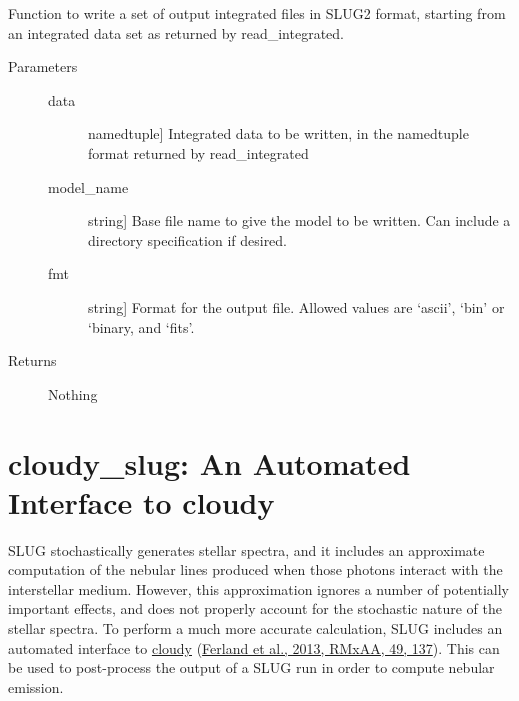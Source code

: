 \documentclass[letterpaper,10pt,english]{sphinxmanual}
\begin{document}
\begin{fulllineitems}
\label{slugpy:slugpy.write_integrated}
Function to write a set of output integrated files in SLUG2 format,
starting from an integrated data set as returned by
read\_integrated.
\begin{description}
\item[{Parameters}] \leavevmode\begin{description}
\item[{data}] \leavevmode{[}namedtuple{]}
Integrated data to be written, in the namedtuple format returned
by read\_integrated

\item[{model\_name}] \leavevmode{[}string{]}
Base file name to give the model to be written. Can include a
directory specification if desired.

\item[{fmt}] \leavevmode{[}string{]}
Format for the output file. Allowed values are `ascii', `bin'
or `binary, and `fits'.

\end{description}

\item[{Returns}] \leavevmode
Nothing

\end{description}

\end{fulllineitems}



\chapter{cloudy\_slug: An Automated Interface to cloudy}
\label{cloudy:cloudy-slug-an-automated-interface-to-cloudy}\label{cloudy::doc}\label{cloudy:sec-cloudy-slug}
SLUG stochastically generates stellar spectra, and it includes an
approximate computation of the nebular lines produced when those
photons interact with the interstellar medium. However, this
approximation ignores a number of potentially important effects, and
does not properly account for the stochastic nature of the stellar
spectra. To perform a much more accurate calculation, SLUG includes an
automated interface to \href{http://nublado.org/}{cloudy} (\href{http://adsabs.harvard.edu/abs/2013RMxAA..49..137F}{Ferland et
al., 2013, RMxAA, 49, 137}). This can be
used to post-process the output of a SLUG run in order to compute
nebular emission.
\end{document}
